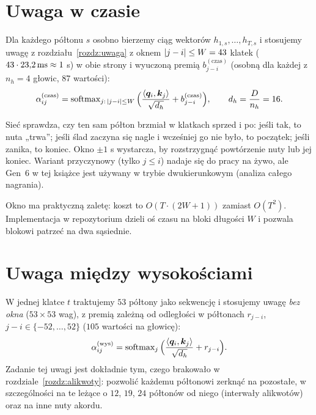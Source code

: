 \section{Uwaga w czasie}

Dla każdego półtonu $s$ osobno bierzemy ciąg wektorów $h_{1,s},\dots,h_{T,s}$ i stosujemy uwagę z rozdziału~\ref{rozdz:uwaga} z oknem $\left\lvert j-i\right\rvert\le W=43$ klatek ($43\cdot23{,}2\,\mathrm{ms}\approx1$ s) w obie strony i wyuczoną premią $b^{\mathrm{(czas)}}_{j-i}$ (osobną dla każdej z $n_h=4$ głowic, $87$ wartości):
\begin{equation}
  \alpha^{\mathrm{(czas)}}_{ij}=\operatorname{softmax}_{j:\,\left\lvert j-i\right\rvert\le W}\Big(\frac{\left\langle \bm{q}_i,\bm{k}_j\right\rangle}{\sqrt{d_h}}+b^{\mathrm{(czas)}}_{j-i}\Big),\qquad d_h=\frac{D}{n_h}=16.
\end{equation}

\begin{intuicja}
Sieć sprawdza, czy ten sam półton brzmiał w klatkach sprzed i po: jeśli tak, to nuta „trwa”; jeśli ślad zaczyna się nagle i wcześniej go nie było, to początek; jeśli zanika, to koniec. Okno $\pm1$ s wystarcza, by rozstrzygnąć powtórzenie nuty lub jej koniec.
Wariant przyczynowy (tylko $j\le i$) nadaje się do pracy na żywo, ale Gen~6 w tej książce jest używany w trybie dwukierunkowym (analiza całego nagrania).
\end{intuicja}

Okno ma praktyczną zaletę: koszt to $O(T\cdot(2W+1))$ zamiast $O(T^2)$. Implementacja w repozytorium dzieli oś czasu na bloki długości $W$ i pozwala blokowi patrzeć na dwa sąsiednie.

\section{Uwaga między wysokościami}

W jednej klatce $t$ traktujemy $53$ półtony jako sekwencję i stosujemy uwagę \emph{bez okna} ($53\times53$ wag), z premią zależną od odległości w półtonach $r_{j-i}$, $j-i\in\{-52,\dots,52\}$ ($105$ wartości na głowicę):
\begin{equation}
  \alpha^{\mathrm{(wys)}}_{ij}=\operatorname{softmax}_{j}\Big(\frac{\left\langle \bm{q}_i,\bm{k}_j\right\rangle}{\sqrt{d_h}}+r_{j-i}\Big).
\end{equation}
Zadanie tej uwagi jest dokładnie tym, czego brakowało w rozdziale~\ref{rozdz:alikwoty}: pozwolić każdemu półtonowi zerknąć na pozostałe, w szczególności na te leżące o $12$, $19$, $24$ półtonów od niego (interwały alikwotów) oraz na inne nuty akordu.

